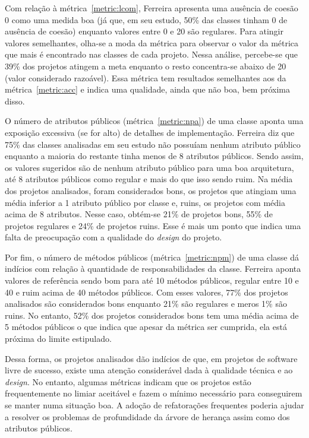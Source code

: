 Com relação à métrica~\ref{metric:lcom}, Ferreira apresenta uma
ausência de coesão 0 como uma medida boa (já que, em seu estudo, 50\%
das classes tinham 0 de ausência de coesão) enquanto valores entre 0 e
20 são regulares. Para atingir valores semelhantes, olha-se a moda da
métrica para observar o valor da métrica que mais é encontrado nas
classes de cada projeto. Nessa análise, percebe-se que 39\% dos
projetos atingem a meta enquanto o resto concentra-se abaixo de 20
(valor considerado razoável). Essa métrica tem resultados semelhantes
aos da métrica~\ref{metric:acc} e indica uma qualidade, ainda que não
boa, bem próxima disso.

O número de atributos públicos (métrica~\ref{metric:npa}) de uma
classe aponta uma exposição excessiva (se for alto) de detalhes de
implementação. Ferreira diz que 75\% das classes analisadas em seu
estudo não possuíam nenhum atributo público enquanto a maioria do
restante tinha menos de 8 atributos públicos. Sendo assim, os valores
sugeridos são de nenhum atributo público para uma boa arquitetura, até
8 atributos públicos como regular e mais do que isso sendo ruim. Na
média dos projetos analisados, foram considerados bons, os projetos
que atingiam uma média inferior a 1 atributo público por classe e,
ruins, os projetos com média acima de 8 atributos. Nesse caso,
obtém-se 21\% de projetos bons, 55\% de projetos regulares e 24\% de
projetos ruins. Esse é mais um ponto que indica uma falta de
preocupação com a qualidade do \textit{design} do projeto.

Por fim, o número de métodos públicos (métrica~\ref{metric:npm}) de
uma classe dá indícios com relação à quantidade de responsabilidades
da classe. Ferreira aponta valores de referência sendo bom para até 10
métodos públicos, regular entre 10 e 40 e ruim acima de 40 métodos
públicos. Com esses valores, 77\% dos projetos analisados são
considerados bons enquanto 21\% são regulares e meros 1\% são
ruins. No entanto, 52\% dos projetos considerados bons tem uma média
acima de 5 métodos públicos o que indica que apesar da métrica ser
cumprida, ela está próxima do limite estipulado.

Dessa forma, os projetos analisados dão indícios de que, em projetos
de software livre de sucesso, existe uma atenção considerável dada à
qualidade técnica e ao \textit{design}. No entanto, algumas métricas
indicam que os projetos estão frequentemente no limiar aceitável e
fazem o mínimo necessário para conseguirem se manter numa situação
boa. A adoção de refatorações frequentes poderia ajudar a resolver os
problemas de profundidade da árvore de herança assim como dos
atributos públicos.

